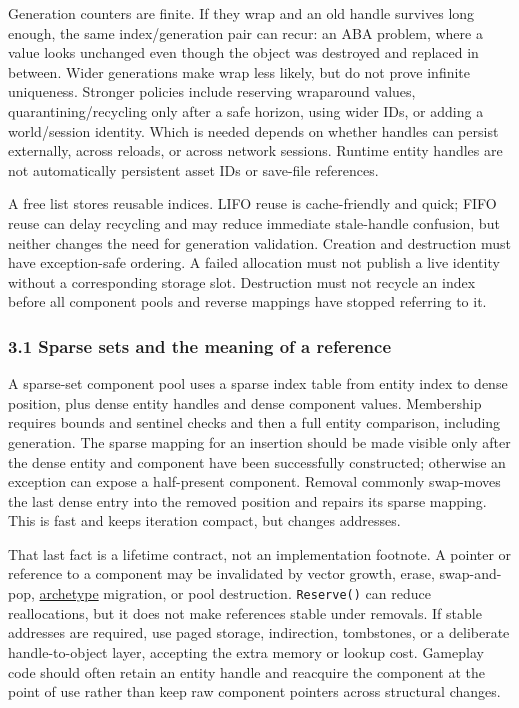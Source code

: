 Generation counters are finite. If they wrap and an old handle survives long enough, the same index/generation pair can recur: an ABA problem, where a value looks unchanged even though the object was destroyed and replaced in between. Wider generations make wrap less likely, but do not prove infinite uniqueness. Stronger policies include reserving wraparound values, quarantining/recycling only after a safe horizon, using wider IDs, or adding a world/session identity. Which is needed depends on whether handles can persist externally, across reloads, or across network sessions. Runtime entity handles are not automatically persistent asset IDs or save-file references.

A free list stores reusable indices. LIFO reuse is cache-friendly and quick; FIFO reuse can delay recycling and may reduce immediate stale-handle confusion, but neither changes the need for generation validation. Creation and destruction must have exception-safe ordering. A failed allocation must not publish a live identity without a corresponding storage slot. Destruction must not recycle an index before all component pools and reverse mappings have stopped referring to it.

\subsubsection{3.1 Sparse sets and the meaning of a reference}\label{05-engine-i-ch008-sparse-sets-and-the-meaning-of-a-reference}

A sparse-set component pool uses a sparse index table from entity index to dense position, plus dense entity handles and dense component values. Membership requires bounds and sentinel checks and then a full entity comparison, including generation. The sparse mapping for an insertion should be made visible only after the dense entity and component have been successfully constructed; otherwise an exception can expose a half-present component. Removal commonly swap-moves the last dense entry into the removed position and repairs its sparse mapping. This is fast and keeps iteration compact, but changes addresses.

That last fact is a lifetime contract, not an implementation footnote. A pointer or reference to a component may be invalidated by vector growth, erase, swap-and-pop, \hyperref[appendix-fbfeb0430008]{archetype} migration, or pool destruction. \texttt{Reserve()} can reduce reallocations, but it does not make references stable under removals. If stable addresses are required, use paged storage, indirection, tombstones, or a deliberate handle-to-object layer, accepting the extra memory or lookup cost. Gameplay code should often retain an entity handle and reacquire the component at the point of use rather than keep raw component pointers across structural changes.

